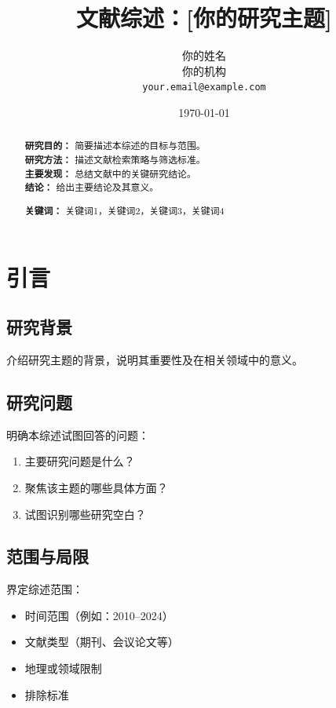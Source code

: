 \documentclass[11pt,a4paper]{article}
\title{\textbf{文献综述：[你的研究主题]}}
\author{你的姓名 \\
        你的机构 \\
        \texttt{your.email@example.com}}
\date{\today}
\begin{document}
\maketitle

\begin{abstract}
\noindent
\textbf{研究目的：} 简要描述本综述的目标与范围。 \\
\textbf{研究方法：} 描述文献检索策略与筛选标准。 \\
\textbf{主要发现：} 总结文献中的关键研究结论。 \\
\textbf{结论：} 给出主要结论及其意义。

\vspace{0.5em}
\noindent\textbf{关键词：} 关键词1，关键词2，关键词3，关键词4
\end{abstract}

\tableofcontents
\newpage

\section{引言}
\label{sec:intro}

\subsection{研究背景}
介绍研究主题的背景，说明其重要性及在相关领域中的意义。

\subsection{研究问题}
明确本综述试图回答的问题：
\begin{enumerate}
    \item 主要研究问题是什么？
    \item 聚焦该主题的哪些具体方面？
    \item 试图识别哪些研究空白？
\end{enumerate}

\subsection{范围与局限}
界定综述范围：
\begin{itemize}
    \item 时间范围（例如：2010–2024）
    \item 文献类型（期刊、会议论文等）
    \item 地理或领域限制
    \item 排除标准
\end{itemize}
\end{document}
